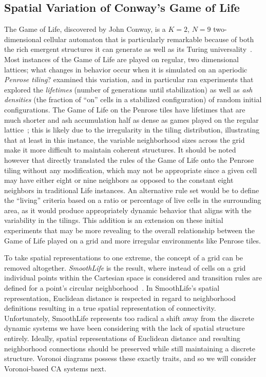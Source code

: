 \documentclass[a4paper,11pt,twoside]{report}
\begin{document}
\subsection{Spatial Variation of Conway's Game of Life}
\label{subsec:gol}
The Game of Life, discovered by John Conway, is a $K=2$, $N=9$ two-dimensional cellular automaton that is particularly remarkable because of both the rich emergent structures it can generate as well as its Turing universality~\cite{ga70}. Most instances of the Game of Life are played on regular, two dimensional lattices; what changes in behavior occur when it is simulated on an aperiodic \textit{Penrose tiling}? \citeauthor{hi05} examined this variation, and in particular ran experiments that explored the \textit{lifetimes} (number of generations until stabilization) as well as  \textit{ash densities} (the fraction of ``on'' cells in a stabilized configuration) of random initial configurations. The Game of Life on the Penrose tiles have lifetimes that are much shorter and ash accumulation half as dense as games played on the regular lattice~\cite{hi05}; this is likely due to the irregularity in the tiling distribution, illustrating that at least in this instance, the variable neighborhood sizes across the grid make it more difficult to maintain coherent structures. It should be noted however that \citeauthor{hi05} directly translated the rules of the Game of Life onto the Penrose tiling without any modification, which may not be appropriate since a given cell may have either eight or nine neighbors as opposed to the constant eight neighbors in traditional Life instances. An alternative rule set would be to define the ``living'' criteria based on a ratio or percentage of live cells in the surrounding area, as it would produce appropriately dynamic behavior that aligns with the variability in the tilings. This addition is an extension on these initial experiments that may be more revealing to the overall relationship between the Game of Life played on a grid and more irregular environments like Penrose tiles. 

To take spatial representations to one extreme, the concept of a grid can be removed altogether. \textit{SmoothLife} is the result, where instead of cells on a grid individual points within the Cartesian space is considered and transition rules are defined for a point's circular neighborhood~\cite{ra11}. In SmoothLife's spatial representation, Euclidean distance is respected in regard to neighborhood definitions resulting in a true spatial representation of connectivity. Unfortunately, SmoothLife represents too radical a shift away from the discrete dynamic systems we have been considering with the lack of spatial structure entirely. Ideally, spatial representations of Euclidean distance and resulting neighborhood connections should be preserved while still maintaining a discrete structure. Voronoi diagrams possess these exactly traits, and so we will consider Voronoi-based CA systems next.
\end{document}
